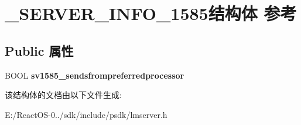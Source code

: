\hypertarget{struct___s_e_r_v_e_r___i_n_f_o__1585}{}\section{\+\_\+\+S\+E\+R\+V\+E\+R\+\_\+\+I\+N\+F\+O\+\_\+1585结构体 参考}
\label{struct___s_e_r_v_e_r___i_n_f_o__1585}
\subsection*{Public 属性}
\begin{DoxyCompactItemize}
\item 
\mbox{\label{struct___s_e_r_v_e_r___i_n_f_o__1585_ab18cc6bb1f5f8b00a520bb44b0237d9a}} 
B\+O\+OL {\bfseries sv1585\+\_\+sendsfrompreferredprocessor}
\end{DoxyCompactItemize}


该结构体的文档由以下文件生成\+:\begin{DoxyCompactItemize}
\item 
E\+:/\+React\+O\+S-\/0../sdk/include/psdk/lmserver.\+h\end{DoxyCompactItemize}

